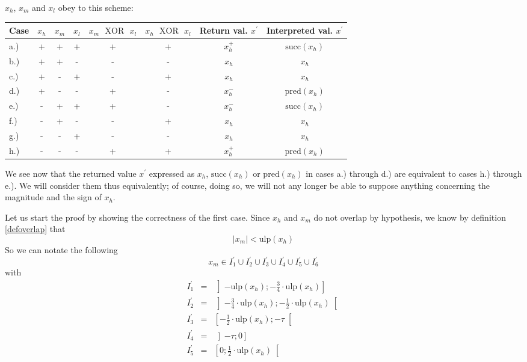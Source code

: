 \documentclass[a4paper,10pt,twoside]{article}
\newenvironment{proof}[1][Proof]{\begin{trivlist}
\item[\hskip \labelsep {\bfseries #1}]}{\end{trivlist}}
\newcommand{\hi}{\ensuremath{\mathit{h}}}
\newcommand{\mi}{\ensuremath{\mathit{m}}}
\newcommand{\lo}{\ensuremath{\mathit{l}}}
\newcommand{\mUlp}{\ensuremath{\mathrm{ulp}}}
\renewcommand{\succ}{\ensuremath{\mathrm{succ}}}
\newcommand{\pred}{\ensuremath{\mathrm{pred}}}
\newcommand{\xor}{\ensuremath{\mbox{ }\mathrm{XOR}\mbox{ }}}
\begin{document}
\begin{proof}
\begin{enumerate}
$x_\hi$, $x_\mi$ and $x_\lo$ obey to this scheme:
\begin{center}
\begin{tabular}{l|ccc|cc|c|c}
Case & $x_\hi$ & $x_\mi$ & $x_\lo$ & $x_\mi \xor x_\lo$ & $x_\hi \xor x_\lo$ & 
Return val. $x^\prime$ & Interpreted val. $x^\prime$ \\
\hline 
a.) & + & + & + & + & + & $x_\hi^+$ & $\succ\left( x_\hi \right)$ \\
b.) & + & + & - & - & - & $x_\hi$ & $x_\hi$ \\
c.) & + & - & + & - & + & $x_\hi$ & $x_\hi$ \\
d.) & + & - & - & + & - & $x_\hi^-$ & $\pred\left( x_\hi \right)$ \\
e.) & - & + & + & + & - & $x_\hi^-$ & $\succ\left( x_\hi \right)$ \\
f.) & - & + & - & - & + & $x_\hi$ & $x_\hi$ \\
g.) & - & - & + & - & - & $x_\hi$ & $x_\hi$ \\
h.) & - & - & - & + & + & $x_\hi^+$ & $\pred\left( x_\hi \right)$
\end{tabular}
\end{center}
We see now that the returned value $x^\prime$ expressed as $x_\hi$, $\succ\left(x_\hi\right)$ or $\pred\left(x_\hi\right)$ in 
cases a.) through d.) are equivalent to cases h.) through e.). 
We will consider them thus equivalently; of course, doing so, we will not any longer be able to suppose anything 
concerning the magnitude and the sign of $x_\hi$.
\end{enumerate}
Let us start the proof by showing the correctness of the first case.
Since $x_\hi$ and $x_\mi$ do not overlap by hypothesis, we know by definition \ref{defoverlap} that 
$$\left \vert x_\mi \right \vert < \mUlp\left( x_\hi \right)$$
So we can notate the following
$$x_\mi \in I^\prime_1 \cup I^\prime_2 \cup I^\prime_3 \cup I^\prime_4 \cup I^\prime_5 \cup I^\prime_6$$
with
\begin{eqnarray*}
I^\prime_1 & = & \left] - \mUlp\left( x_\hi \right) ; -\frac{3}{4} \cdot \mUlp\left(x_\hi \right) \right] \\
I^\prime_2 & = & \left] -\frac{3}{4} \cdot \mUlp\left(x_\hi \right) ; 
- \frac{1}{2} \cdot \mUlp\left(x_\hi \right) \right[ \\
I^\prime_3 & = & \left[ - \frac{1}{2} \cdot \mUlp\left(x_\hi \right); -\tau \right[ \\
I^\prime_4 & = & \left] -\tau ; 0 \right] \\
I^\prime_5 & = & \left[ 0; \frac{1}{2} \cdot \mUlp\left(x_\hi\right) \right[ \\

\end{eqnarray*}
\end{proof}
\end{document}
